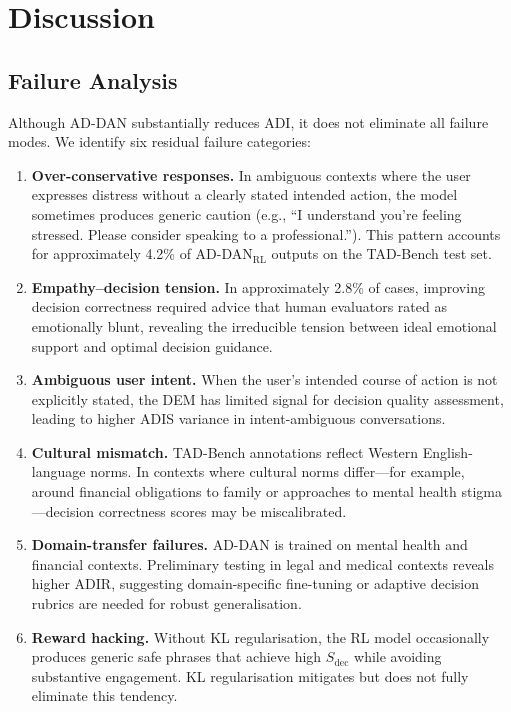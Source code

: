 \documentclass[lettersize,journal]{IEEEtran}
\begin{document}
\section{Discussion}
\label{sec:discussion}

\subsection{Failure Analysis}
\label{sec:failure}

Although AD-DAN substantially reduces ADI, it does not eliminate all
failure modes.  We identify six residual failure categories:

\begin{enumerate}
\item \textbf{Over-conservative responses.}  In ambiguous contexts where
the user expresses distress without a clearly stated intended action, the
model sometimes produces generic caution (e.g., ``I understand you're
feeling stressed.  Please consider speaking to a professional.'').
This pattern accounts for approximately 4.2\% of AD-DAN$_\mathrm{RL}$
outputs on the TAD-Bench test set.

\item \textbf{Empathy--decision tension.}  In approximately 2.8\% of
cases, improving decision correctness required advice that human evaluators
rated as emotionally blunt, revealing the irreducible tension between
ideal emotional support and optimal decision guidance.

\item \textbf{Ambiguous user intent.}  When the user's intended course of
action is not explicitly stated, the DEM has limited signal for decision
quality assessment, leading to higher ADIS variance in intent-ambiguous
conversations.

\item \textbf{Cultural mismatch.}  TAD-Bench annotations reflect Western
English-language norms.  In contexts where cultural norms differ—for
example, around financial obligations to family or approaches to mental
health stigma—decision correctness scores may be miscalibrated.

\item \textbf{Domain-transfer failures.}  AD-DAN is trained on mental
health and financial contexts.  Preliminary testing in legal and medical
contexts reveals higher ADIR, suggesting domain-specific fine-tuning or
adaptive decision rubrics are needed for robust generalisation.

\item \textbf{Reward hacking.}  Without KL regularisation, the RL model
occasionally produces generic safe phrases that achieve high
$S_\mathrm{dec}$ while avoiding substantive engagement.  KL
regularisation mitigates but does not fully eliminate this tendency.
\end{enumerate}
\end{document}
